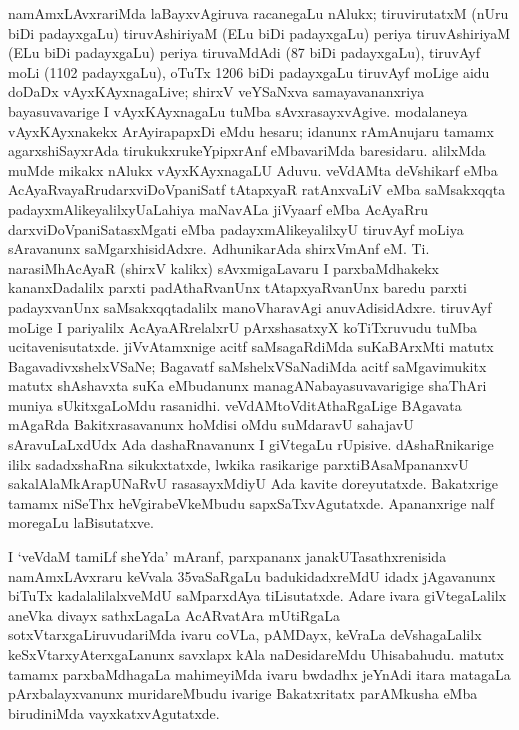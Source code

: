 namAmxLAvxrariMda laBayxvAgiruva racanegaLu nAlukx; tiruvirutatxM (nUru biDi padayx\-gaLu) tiruvAshiriyaM (ELu biDi padayxgaLu) periya tiruvAshiriyaM (ELu biDi padayx\-gaLu) periya tiruvaMdAdi ({\rm 87} biDi padayxgaLu), tiruvAyf moLi ({\rm 1102} padayx\-gaLu), oTuTx {\rm 1206} biDi padayxgaLu tiruvAyf moLige aidu doDaDx vAyxKAyxna\-gaLive; shirxV veYSaNxva samayavananxriya bayasuvavarige I vAyxKAyxnagaLu tuMba sAvxrasayx\-vAgive. modalaneya vAyxKAyxnakekx ArAyirapapxDi eMdu hesaru; idanunx rAmAnu\-jaru tamamx agarxshiSayxrAda tirukukxrukeYpipxrAnf eMbavariMda baresidaru. alilxMda muMde mikakx nAlukx vAyxKAyxnagaLU Aduvu. veVdAMta deVshikarf eMba AcAyaRvayaRru\break darxviDoVpaniSatf tAtapxyaR ratAnxvaLiV eMba saMsakxqqta padayxmAlikeyalilxyU\break aLahiya maNavALa jiVyaarf eMba AcAyaRru darxviDoVpaniSatasxMgati eMba padayx\-mAlikeyalilxyU tiruvAyf moLiya sAravanunx saMgarxhisidAdxre. AdhunikarAda shirxVmAnf eM. Ti. narasiMhAcAyaR (shirxV kalikx) sAvxmigaLavaru I parxbaMdhakekx kananxDadalilx parxti padAthaRvanUnx tAtapxyaRvanUnx baredu parxti padayxvanUnx saMsakxqqtadalilx manoVhara\-vAgi anuvAdisidAdxre. tiruvAyf moLige I pariyalilx AcAyaARrelalxrU pArxshasatxyX koTiTxruvudu tuMba ucitavenisutatxde. jiVvAtamxnige acitf saMsagaRdiMda suKaBArxMti matutx BagavadivxshelxVSaNe; Bagavatf saMshelxVSaNadiMda acitf saMgavimukitx matutx shAshavxta suKa eMbudanunx managANabayasuvavarigige shaThAri muniya sUkitxgaLoMdu rasanidhi. veVdAMtoVditAthaRgaLige BAgavata mAgaRda Bakitxrasavanunx hoMdisi oMdu suMdaravU sahajavU sAravuLaLxdUdx Ada dashaRnavanunx I giVtegaLu rUpisive. dAshaRnikarige ililx sadadxshaRna sikukxtatxde, lwkika rasikarige parxtiBAsaMpananxvU sakalAlaMkArapUNaRvU rasasayxMdiyU Ada kavite doreyutatxde. Bakatxrige tamamx niSeThx heVgirabeVkeMbudu sapxSaTxvAgutatxde. Apananxrige nalf moregaLu laBisutatxve.

I `veVdaM tamiLf sheYda' mAranf, parxpananx janakUTasathxrenisida namAmxLAvxraru keVvala {\rm 35}vaSaRgaLu badukidadxreMdU idadx jAgavanunx biTuTx kadalalilalxveMdU saMparxdAya
tiLisutatxde. Adare ivara giVtegaLalilx aneVka divayx sathxLagaLa AcARvatAra mUtiRgaLa sotxVtarxgaLiruvudariMda ivaru coVLa, pAMDayx, keVraLa deVshagaLalilx keSxVtarxyAterxgaLanunx savxlapx kAla naDesidareMdu Uhisabahudu. matutx tamamx parxbaMdhagaLa mahimeyiMda ivaru bwdadhx jeYnAdi itara matagaLa pArxbalayxvanunx muridareMbudu ivarige Bakatxritatx parAMkusha eMba birudiniMda vayxkatxvAgutatxde.


